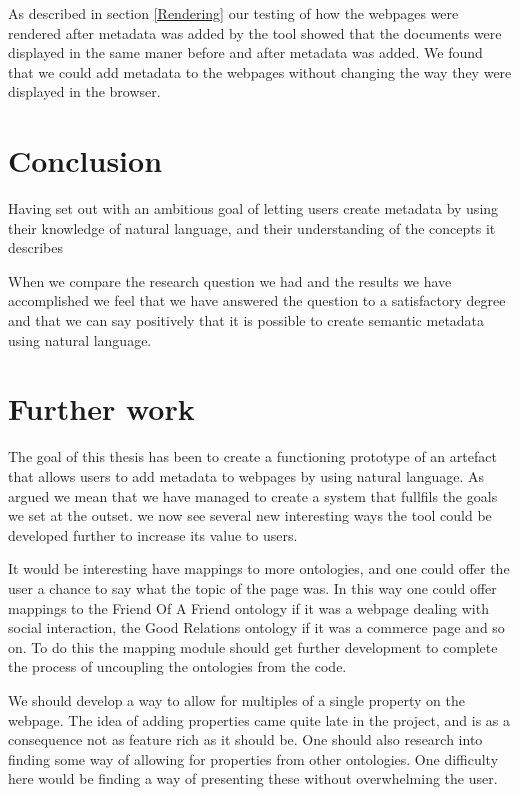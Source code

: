 As described in section \ref{Rendering} our testing of how the webpages were rendered after metadata was added by the tool
showed that the documents were displayed in the same maner before and after metadata was added.
We found that we could add metadata to the webpages without changing the way they were displayed in the browser.

\section{Conclusion}


Having set out with an ambitious goal of letting users create metadata by using their knowledge of natural language,
and their understanding of the concepts it describes

When we compare the research question we had and the results we have accomplished we feel that we have answered the
question to a satisfactory degree and that we can say positively that it is possible to create semantic metadata
using natural language.

\section{Further work}
The goal of this thesis has been to create a functioning prototype of an artefact that allows users to add metadata
to webpages by using natural language.
As argued we mean that we have managed to create a system that fullfils the goals we set at the outset.
we now see several new interesting ways the tool could be developed further to increase its value to users.

It would be interesting have mappings to more ontologies,
and one could offer the user a chance to say what the topic of the page was.
In this way one could offer mappings to the Friend Of A Friend ontology if it was a webpage dealing with
social interaction, the Good Relations ontology if it was a commerce page and so on.
To do this the mapping module should get further development to complete the process of uncoupling the ontologies
from the code.

We should develop a way to allow for multiples of a single property on the webpage.
The idea of adding properties came quite late in the project,
and is as a consequence not as feature rich as it should be.
One should also research into finding some way of allowing for properties from other ontologies.
One difficulty here would be finding a way of presenting these without overwhelming the user.

